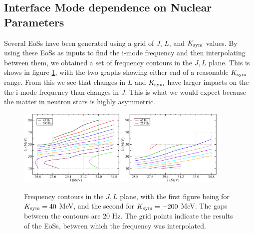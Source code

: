 \documentclass[fleqn,usenatbib]{mnras}
\begin{document}
\subsection{Interface Mode dependence on Nuclear Parameters}
\hspace{\parindent}Several EoSs have been generated using a grid of $J$, $L$, and $K_{\rm sym}$ values. By using these EoSs as inputs to find the i-mode frequency and then interpolating between them, we obtained a set of frequency contours in the $J,L$ plane. This is shows in figure \ref{fig:freq_contours}, with the two graphs showing either end of a reasonable $K_{\rm sym}$ range. From this we see that changes in $L$ and $K_{\rm sym}$ have larger impacts on the the i-mode frequency than changes in $J$. This is what we would expect because the matter in neutron stars is highly asymmetric.



\begin{figure}
\centering
\includegraphics[width=0.45\textwidth,angle=0]{contours_20gap_K40}
\includegraphics[width=0.45\textwidth,angle=0]{contours_20gap_Km200}
\caption{Frequency contours in the $J,L$ plane, with the first figure being for $K_{\rm sym}=40$ MeV, and the second for $K_{\rm sym}=-200$ MeV. The gaps between the contours are $20$ Hz. The grid points indicate the results of the EoSs, between which the frequency was interpolated.}
\label{fig:freq_contours}
\end{figure}
\end{document}
